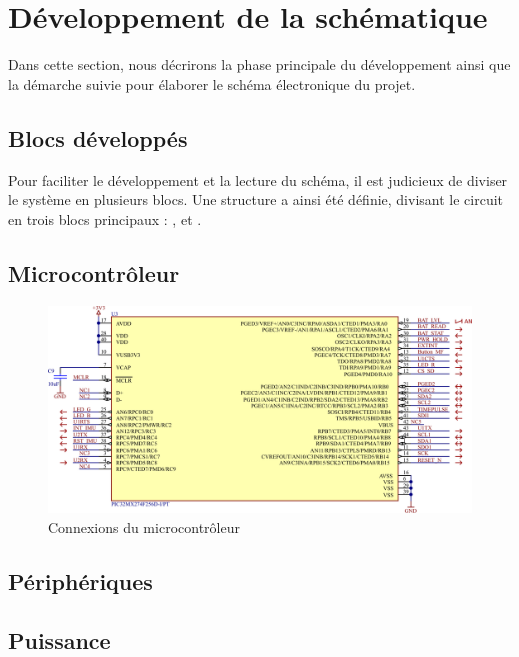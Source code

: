 \section{Développement de la schématique} \label{sec:Dev-Schematique}
Dans cette section, nous décrirons la phase principale du développement ainsi que la démarche suivie pour élaborer le schéma électronique du projet.

\subsection{Blocs développés} \label{ssec:Dev-blocs}
Pour faciliter le développement et la lecture du schéma, il est judicieux de diviser le système en plusieurs blocs. Une structure a ainsi été définie, divisant le circuit en trois blocs principaux : ,  et .



\subsection{Microcontrôleur} \label{ssec:Dev-MCU}
\clearpage

\begin{figure}[h]
	\centering
	\includegraphics[width=1\linewidth]{../figures/etude/sch/MCU}
	\caption{Connexions du microcontrôleur}
	\label{fig:mcu}
\end{figure}

\subsection{Périphériques} \label{ssec:Dev-Devices}

\subsection{Puissance} \label{ssec:Dev-Power}

